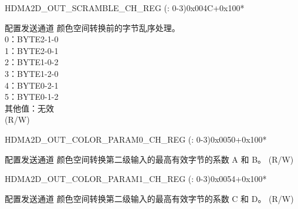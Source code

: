 \begin{register}{H}{DMA2D\_OUT\_SCRAMBLE\_CH\_REG (: 0-3)}{0x004C+0x100*}\label{regdesc:DMA2DOUTSCRAMBLECHNREG}
%
%
\regnewline%
\begin{regdesc}\begin{reglist}
\label{fielddesc:DMA2DOUTSCRAMBLESELPRECHN}\item [DMA2D\_OUT\_SCRAMBLE\_SEL\_PRE\_CH\regindex{n}] 配置发送通道  颜色空间转换前的字节乱序处理。\\
0：BYTE2-1-0\\
1：BYTE2-0-1\\
2：BYTE1-0-2\\
3：BYTE1-2-0\\
4：BYTE0-2-1\\
5：BYTE0-1-2\\
其他值：无效\\ (R/W)
\end{reglist}\end{regdesc}
\end{register}


\begin{register}{H}{DMA2D\_OUT\_COLOR\_PARAM0\_CH\_REG (: 0-3)}{0x0050+0x100*}\label{regdesc:DMA2DOUTCOLORPARAM0CHNREG}
%
%
\regnewline%
\begin{regdesc}\begin{reglist}
\label{fielddesc:DMA2DOUTCOLORPARAMH0CHN}\item [DMA2D\_OUT\_COLOR\_PARAM\_H0\_CH\regindex{n}] 配置发送通道  颜色空间转换第二级输入的最高有效字节的系数 A 和 B。 (R/W)
\end{reglist}\end{regdesc}
\end{register}


\begin{register}{H}{DMA2D\_OUT\_COLOR\_PARAM1\_CH\_REG (: 0-3)}{0x0054+0x100*}\label{regdesc:DMA2DOUTCOLORPARAM1CHNREG}
%
%
\regnewline%
\begin{regdesc}\begin{reglist}
\label{fielddesc:DMA2DOUTCOLORPARAMH1CHN}\item [DMA2D\_OUT\_COLOR\_PARAM\_H1\_CH\regindex{n}] 配置发送通道  颜色空间转换第二级输入的最高有效字节的系数 C 和 D。 (R/W)
\end{reglist}\end{regdesc}
\end{register}



